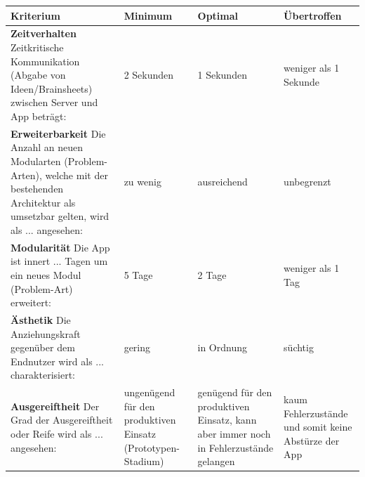 \begin{center}
    \begin{tabular}{ | p{6cm} | p{2.5cm} | p{2.5cm} | p{2.5cm} |}
    	\hline
    Kriterium & Minimum & Optimal & Übertroffen \\ 
    	\hline
    \textbf{Zeitverhalten} \newline Zeitkritische Kommunikation (Abgabe von Ideen/Brainsheets) zwischen Server und App beträgt: & 2 Sekunden & 1 Sekunden & weniger als 1 Sekunde \\
    	\hline
    \textbf{Erweiterbarkeit} \newline Die Anzahl an neuen Modularten (Problem-Arten), welche mit der bestehenden Architektur als umsetzbar gelten, wird als ... angesehen: & zu wenig & ausreichend & unbegrenzt \\
    	\hline
    \textbf{Modularität} \newline Die App ist innert ... Tagen um ein neues Modul (Problem-Art) erweitert: & 5 Tage & 2 Tage & weniger als 1 Tag \\
    	\hline
    \textbf{Ästhetik} \newline Die Anziehungskraft gegenüber dem Endnutzer wird als ... charakterisiert: & gering & in Ordnung & süchtig \\
    	\hline
    \textbf{Ausgereiftheit} \newline Der Grad der Ausgereiftheit oder Reife wird als ... angesehen: & ungenügend für den produktiven Einsatz (Prototypen-Stadium) & genügend für den produktiven Einsatz, kann aber immer noch in Fehlerzustände gelangen & kaum Fehlerzustände und somit keine Abstürze der App  \\
    	\hline
    \end{tabular}
\end{center}
